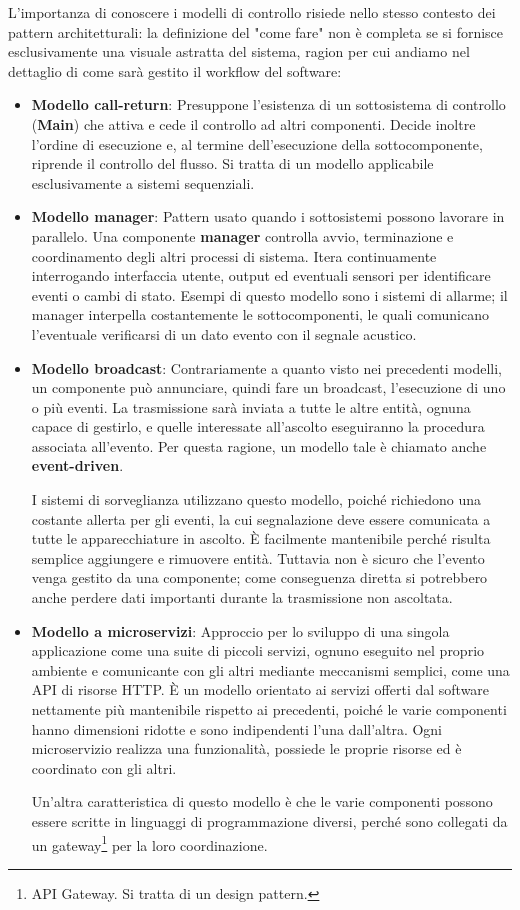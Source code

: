 \noindent L'importanza di conoscere i modelli di controllo risiede nello stesso contesto dei pattern architetturali: la definizione del "come fare" non è completa se si fornisce esclusivamente una visuale astratta del sistema, ragion per cui andiamo nel dettaglio di come sarà gestito il workflow del software: \begin{itemize}
	\item \textbf{Modello call-return}: Presuppone l'esistenza di un sottosistema di controllo (\textbf{Main}) che attiva e cede il controllo ad altri componenti. Decide inoltre l'ordine di esecuzione e, al termine dell'esecuzione della sottocomponente, riprende il controllo del flusso. Si tratta di un modello applicabile esclusivamente a sistemi sequenziali.
	\item \textbf{Modello manager}: Pattern usato quando i sottosistemi possono lavorare in parallelo. Una componente \textbf{manager} controlla avvio, terminazione e coordinamento degli altri processi di sistema. Itera continuamente interrogando interfaccia utente, output ed eventuali sensori per identificare eventi o cambi di stato. Esempi di questo modello sono i sistemi di allarme; il manager interpella costantemente le sottocomponenti, le quali comunicano l'eventuale verificarsi di un dato evento con il segnale acustico.
	\item \textbf{Modello broadcast}: Contrariamente a quanto visto nei precedenti modelli, un componente può annunciare, quindi fare un broadcast, l'esecuzione di uno o più eventi. La trasmissione sarà inviata a tutte le altre entità, ognuna capace di gestirlo, e quelle interessate all'ascolto eseguiranno la procedura associata all'evento. Per questa ragione, un modello tale è chiamato anche \textbf{event-driven}.\par
	I sistemi di sorveglianza utilizzano questo modello, poiché richiedono una costante allerta per gli eventi, la cui segnalazione deve essere comunicata a tutte le apparecchiature in ascolto. È facilmente mantenibile perché risulta semplice aggiungere e rimuovere entità. Tuttavia non è sicuro che l'evento venga gestito da una componente; come conseguenza diretta si potrebbero anche perdere dati importanti durante la trasmissione non ascoltata.
	\item \textbf{Modello a microservizi}: Approccio per lo sviluppo di una singola applicazione come una suite di piccoli servizi, ognuno eseguito nel proprio ambiente e comunicante con gli altri mediante meccanismi semplici, come una API di risorse HTTP. È un modello orientato ai servizi offerti dal software nettamente più mantenibile rispetto ai precedenti, poiché le varie componenti hanno dimensioni ridotte e sono indipendenti l'una dall'altra. Ogni microservizio realizza una funzionalità, possiede le proprie risorse ed è coordinato con gli altri.\par
	Un'altra caratteristica di questo modello è che le varie componenti possono essere scritte in linguaggi di programmazione diversi, perché sono collegati da un gateway\footnote{API Gateway. Si tratta di un design pattern.} per la loro coordinazione.
\end{itemize}
